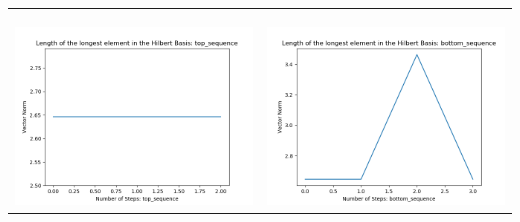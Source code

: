\documentclass[10pt]{article}
\begin{document}
\begin{tabular}{c|c}
\begin{minipage}{.45\textwidth}
\end{minipage} \\ \\
\hline \\\begin{minipage}{.45\textwidth}
\includegraphics[width=\textwidth]{"DATA/5d/6 generators 1 bound G/top_sequence LENGTH"}
\end{minipage} &
\begin{minipage}{.45\textwidth}
\includegraphics[width=\textwidth]{"DATA/5d/6 generators 1 bound G bottomup/bottom_sequence LENGTH"}
\end{minipage}
\end{tabular}
\end{document}
